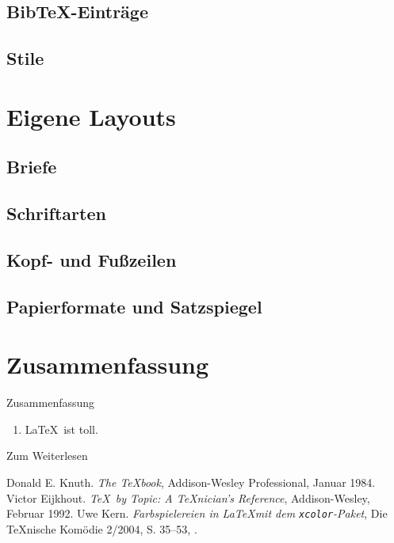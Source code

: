 \subsection{Bib\TeX-Einträge}

\subsection{Stile}

\section{Eigene Layouts}

\subsection{Briefe}

\subsection{Schriftarten}

\subsection{Kopf- und Fußzeilen}

\subsection{Papierformate und Satzspiegel}


\section*{Zusammenfassung}

\begin{frame}{Zusammenfassung}
  \begin{enumerate}
    \item \LaTeX\ ist toll.
  \end{enumerate}
\end{frame}

\begin{Frame}[fragile]{Zum Weiterlesen}
  \begin{thebibliography}{10}
      Donald E. Knuth.
      \newblock \emph{The \TeX book},
      \newblock Addison-Wesley Professional, Januar 1984.
      Victor Eijkhout.
      \newblock \emph{\TeX\ by Topic: A \TeX nician's Reference},
      \newblock Addison-Wesley, Februar 1992.
      Uwe Kern.
      \newblock \emph{Farbspielereien in \LaTeX mit dem \texttt{xcolor}-Paket},
      \newblock Die \TeX nische Komödie 2/2004, S. 35--53,
      \newblock {}.
  \end{thebibliography}
\end{Frame}